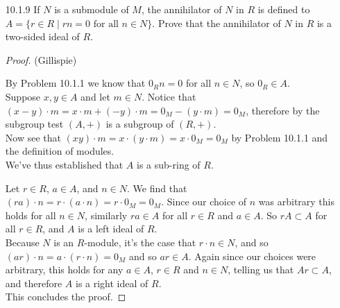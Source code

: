 \documentclass[10pt]{article}
\newcommand{\tor}{\operatorname{Tor}}
\begin{document}
\begin{itemize}
\begin{itemize}
\item [(c)]If $R$ has zero divisors, prove that every nonzero
$R$-module has nonzero torsion elements.

\begin{proof}
[Proof (Granade)] Let $M$ be a nonzero $R$-module and recall that
$0_{R}m=0_{M}$ for all $m\in M$. Moreover, suppose that $R$ has zero
divisors $a,b$. Then, choose $m\in M\backslash\left\{ 0\right\} $.
If $bm=0$, then $m\in\tor\left(M\right)$, and so we are done. Hence,
suppose that $bm\ne0$. Then,
$a\left(bm\right)=\left(ab\right)m=0m=0$, and so
$bm\in\tor\left(M\right)$. In both cases, we have demonstrated a
nonzero torsion element, and so we are done.
\end{proof}
\end{itemize}


\item[10.1.9] If $N$ is a submodule of $M$,
the annihilator of $N$ in $R$ is defined to $A=\{r\in R\mid
rn=0\mbox{ for all }n\in N\}$. Prove that the annihilator of $N$ in
$R$ is a two-sided ideal of $R$.

\begin{proof} (Gillispie)

By Problem 10.1.1 we know that $0_{R}n=0$ for all
$n\in N$, so $0_{R}\in A$.\\
Suppose $x,y\in A$ and let $m\in N$. Notice that $(x-y)\cdot
m=x\cdot m+(-y)\cdot m=0_{M}-(y\cdot m)=0_{M}$,
therefore by the subgroup test $(A,+)$ is a subgroup of $(R,+)$.\\
Now see that $(xy)\cdot m=x\cdot(y\cdot m)=x\cdot0_{M}=0_{M}$ by
Problem 10.1.1 and the definition of modules.\\
We've thus established that $A$ is a sub-ring of $R$.

Let $r\in R$, $a\in A$, and $n\in N$. We find that $(ra)\cdot
n=r\cdot(a\cdot n)=r\cdot0_{M}=0_{M}$. Since our choice of $n$ was
arbitrary this holds for all $n\in N$, similarly $ra\in A$ for all
$r\in R$ and $a\in A$. So $rA\subset A$
for all $r\in R$, and $A$ is a left ideal of $R$.\\
Because $N$ is an $R$-module, it's the case that $r\cdot n\in N$,
and so $(ar)\cdot n=a\cdot(r\cdot n)=0_{M}$ and so $ar\in A$. Again
since our choices were arbitrary, this holds for any $a\in A$, $r\in
R$ and $n\in N$, telling us that $Ar\subset A$, and therefore $A$
is a right ideal of $R$.\\
This concludes the proof.

\end{proof}


\end{itemize}
\end{document}
